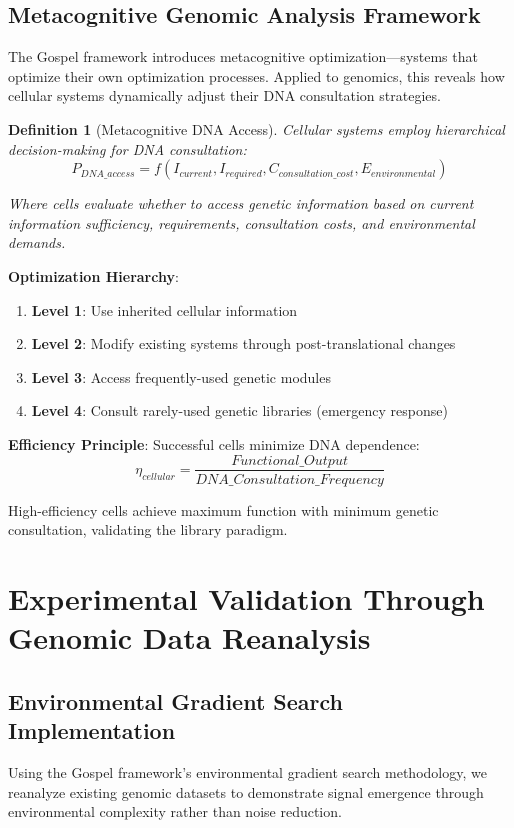 \documentclass[12pt,a4paper]{article}
\newtheorem{definition}[theorem]{Definition}
\begin{document}
\subsection{Metacognitive Genomic Analysis Framework}

The Gospel framework introduces metacognitive optimization—systems that optimize their own optimization processes. Applied to genomics, this reveals how cellular systems dynamically adjust their DNA consultation strategies.

\begin{definition}[Metacognitive DNA Access]
Cellular systems employ hierarchical decision-making for DNA consultation:
$$P_{DNA\_access} = f(I_{current}, I_{required}, C_{consultation\_cost}, E_{environmental})$$

Where cells evaluate whether to access genetic information based on current information sufficiency, requirements, consultation costs, and environmental demands.
\end{definition}

\textbf{Optimization Hierarchy}:
\begin{enumerate}
\item \textbf{Level 1}: Use inherited cellular information
\item \textbf{Level 2}: Modify existing systems through post-translational changes
\item \textbf{Level 3}: Access frequently-used genetic modules
\item \textbf{Level 4}: Consult rarely-used genetic libraries (emergency response)
\end{enumerate}

\textbf{Efficiency Principle}: Successful cells minimize DNA dependence:
$$\eta_{cellular} = \frac{Functional\_Output}{DNA\_Consultation\_Frequency}$$

High-efficiency cells achieve maximum function with minimum genetic consultation, validating the library paradigm.

\section{Experimental Validation Through Genomic Data Reanalysis}

\subsection{Environmental Gradient Search Implementation}

Using the Gospel framework's environmental gradient search methodology, we reanalyze existing genomic datasets to demonstrate signal emergence through environmental complexity rather than noise reduction.
\end{document}
